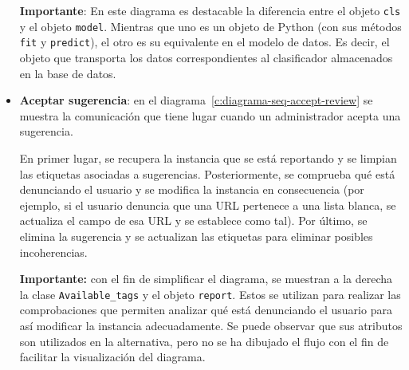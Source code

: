 \begin{itemize}
	\textbf{Importante}: En este diagrama es destacable la diferencia entre el objeto \texttt{cls} y el objeto \texttt{model}. Mientras que uno es un objeto de Python (con sus métodos \texttt{fit} y \texttt{predict}), el otro es su equivalente en el modelo de datos. Es decir, el objeto que transporta los datos correspondientes al clasificador almacenados en la base de datos.
			
	\item \textbf{Aceptar sugerencia}: en el diagrama~\ref{c:diagrama-seq-accept-review} se muestra la comunicación que tiene lugar cuando un administrador acepta una sugerencia.
	
	En primer lugar, se recupera la instancia que se está reportando y se limpian las etiquetas asociadas a sugerencias. Posteriormente, se comprueba qué está denunciando el usuario y se modifica la instancia en consecuencia (por ejemplo, si el usuario denuncia que una URL pertenece a una lista blanca, se actualiza el campo de esa URL y se establece como tal). Por último, se elimina la sugerencia y se actualizan las etiquetas para eliminar posibles incoherencias.
	
	\textbf{Importante:} con el fin de simplificar el diagrama, se muestran a la derecha la clase \texttt{Available\_tags} y el objeto \texttt{report}. Estos se utilizan para realizar las comprobaciones que permiten analizar qué está denunciando el usuario para así modificar la instancia adecuadamente. Se puede observar que sus atributos son utilizados en la alternativa, pero no se ha dibujado el flujo con el fin de facilitar la visualización del diagrama.
	
	
	
\end{itemize}

